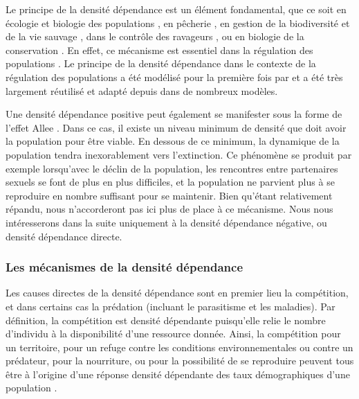 Le principe de la densité dépendance est un élément fondamental, que ce soit en
écologie et biologie des populations \autocites{kingsland1995a}, en pêcherie
\autocites{rose2001a}, en gestion de la biodiversité et de la vie sauvage
\autocites{gordon2004a}, dans le contrôle des ravageurs \autocites{walde1988a},
ou en biologie de la conservation \autocites{ginzburg1990a}. En effet, ce mécanisme est
essentiel dans la régulation des populations \autocites{murdoch1994a,
turchin1990a}. Le principe de la densité dépendance dans le contexte de la
régulation des populations a été modélisé pour la première fois par
\textcite{verhulst1838a} et a été très largement réutilisé et adapté depuis dans
de nombreux modèles. 

Une densité dépendance positive peut également se manifester sous la forme de
l'effet Allee \autocites{courchamp1999a}. Dans ce cas, il existe un niveau
minimum de densité que doit avoir la population pour être viable. En dessous de
ce minimum, la dynamique de la population tendra inexorablement vers
l'extinction. Ce phénomène se produit par exemple lorsqu'avec le déclin de la
population, les rencontres entre partenaires sexuels se font de plus en plus
difficiles, et la population ne parvient plus à se reproduire en nombre
suffisant pour se maintenir. Bien qu'étant relativement répandu, nous
n'accorderont pas ici plus de place à ce mécanisme. Nous nous intéresserons dans
la suite uniquement à la densité dépendance négative, ou densité dépendance
directe. 

\subsubsection{Les mécanismes de la densité dépendance}

Les causes directes de la densité dépendance sont en premier lieu la
compétition, et dans certains cas la prédation (incluant le parasitisme et les
maladies). Par définition, la compétition est densité dépendante puisqu'elle
relie le nombre d'individu à la disponibilité d'une ressource donnée. Ainsi, la
compétition pour un territoire, pour un refuge contre les conditions
environnementales ou contre un prédateur, pour la nourriture, ou pour la
possibilité de se reproduire peuvent tous être à l'origine d'une réponse densité
dépendante des taux démographiques d'une population
\autocites{keddy1989a,begon2009a}.


